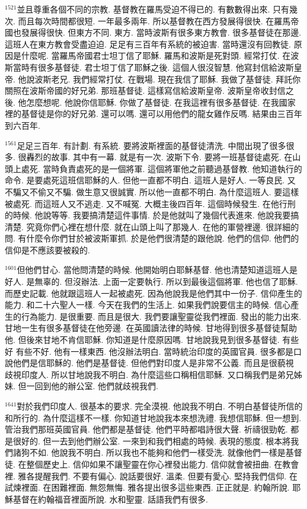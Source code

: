 \documentclass{book}
\begin{document}
$^{1521}$並且尊重各個不同的宗教.
基督教在羅馬受迫不得已的.
有數數得出來.
只有幾次.
而且每次時間都很短.
一年最多兩年.
所以基督教在西方發展得很快.
在羅馬帝國也發展得很快.
但東方不同.
東方.
當時波斯有很多東方教會.
很多基督徒在那邊.
這班人在東方教會受盡迫迫.
足足有三百年有系統的被迫害.
當時還沒有回教徒.
原因是什麼呢.
當羅馬帝國君士坦丁信了耶穌.
羅馬和波斯是死對頭.
經常打仗.
在波斯當時有很多基督徒.
君士坦丁信了耶穌之後.
這個人很沒智慧.
他寫封信給波斯皇帝.
他說波斯老兄.
我們經常打仗.
在戰場.
現在我信了耶穌.
我做了基督徒.
拜託你關照在波斯帝國的好兄弟.
那班基督徒.
這樣寫信給波斯皇帝.
波斯皇帝收封信之後.
他怎麼想呢.
他說你信耶穌.
你做了基督徒.
在我這裡有很多基督徒.
在我國家裡的基督徒是你的好兄弟.
還可以嗎.
還可以用他們的龍女雞作反嗎.
結果由三百年到六百年.

$^{1561}$足足三百年.
有計劃.
有系統.
要將波斯裡面的基督徒清洗.
中間出現了很多很多.
很轟烈的故事.
其中有一幕.
就是有一次.
波斯下令.
要將一班基督徒處死.
在山頭上處死.
當時負責處死的是一個將軍.
這個將軍他之前聽過基督教.
他知道執行的命令.
是要處死這班信耶穌的人.
但他一直都不明白.
這班人是好人.
一等良民.
又不騙又不偷又不騙.
做生意又很誠實.
所以他一直都不明白.
為什麼這班人.
要這樣被處死.
而這班人又不逃走.
又不喊冤.
大概主後四百年.
這個時候發生.
在他行刑的時候.
他說等等.
我要搞清楚這件事情.
於是他就叫了幾個代表進來.
他說我要搞清楚.
究竟你們心裡在想什麼.
就在山頭上叫了那幾人.
在他的軍營裡邊.
很詳細的問.
有什麼令你們甘於被波斯軍抓.
於是他們很清楚的跟他說.
他們的信仰.
他們的信仰是不應該要被殺的.

$^{1601}$但他們甘心.
當他問清楚的時候.
他開始明白耶穌基督.
他也清楚知道這班人是好人.
是無辜的.
但沒辦法.
上面一定要執行.
所以到最後這個將軍.
他也信了耶穌.
而歷史記載.
他就跟這班人一起被處死.
因為他說我是他們其中一份子.
信仰產生的能力.
和二十六聖人一樣.
今天在我們的生活上.
如果我們說要信主的時候.
信心產生的行為能力.
是很重要.
而且是很大.
我們要讓聖靈從我們裡面.
發出的能力出來.
甘地一生有很多基督徒在他旁邊.
在英國讀法律的時候.
甘地得到很多基督徒幫助他.
但後來甘地不肯信耶穌.
你知道是什麼原因嗎.
甘地說我見到很多基督徒.
有些好 有些不好.
他有一樣東西.
他沒辦法明白.
當時統治印度的英國官員.
很多都是口說他們是信耶穌的.
他們是基督徒.
但他們對印度人是非常不公義.
而且是很藐視 歧視印度人.
所以甘地說我不明白.
為什麼這些口稱相信耶穌.
又口稱我們是弟兄姊妹.
但一回到他的辦公室.
他們就歧視我們.

$^{1641}$對於我們印度人.
很基本的要求.
完全漠視.
他說我不明白.
不明白基督徒所信的和所行的.
為什麼這樣不一樣.
你知道甘地說我本來想洗禮.
我想信耶穌.
但一想到.
管治我們那班英國官員.
他們都是基督徒.
他們平時都唱詩很大聲.
祈禱很勁乾.
都是很好的.
但一去到他們辦公室.
一來到和我們相處的時候.
表現的態度.
根本將我們諸狗不如.
他說我不明白.
所以我也不能夠和他們一樣受洗.
就像他們一樣是基督徒.
在整個歷史上.
信仰如果不讓聖靈在你心裡發出能力.
信仰就會被扭曲.
在教會裡.
雅各提醒我們.
不要有偏心.
說話要很好.
溫柔.
但要有愛心.
堅持我們信仰.
在試煉裡面.
在困難裡面.
無怨無悔.
雅各提出很多這些東西.
正正就是.
約翰所說.
耶穌基督在約翰福音裡面所說.
水和聖靈.
話語我們有很多.
\end{document}
